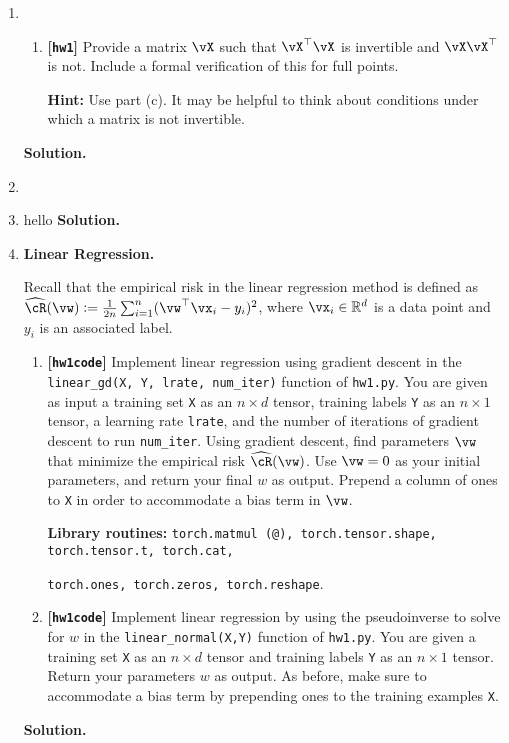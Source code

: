 \documentclass{article}
\def\R{\mathbb{R}}
\def\hcR{\widehat{\cR}}
\def\hw{\textbf{[\texttt{hw1}]}\xspace}
\def\hwcode{\textbf{[\texttt{hw1code}]}\xspace}
\theoremstyle{definition}
\theoremstyle{remark}
\newenvironment{Q}
{%
  \clearpage
  \item
  }
  {%
    \phantom{s} %
    \bigskip
    \textbf{Solution.}
  }
\begin{document}
\begin{enumerate}[font={\Large\bfseries},left=0pt]
\begin{Q}
\begin{enumerate}
    \textbf{Remark:} This characterizes when linear regression has a unique solution due to the normal equation (note that we always have at least one solution obtained by the pseudoinverse). We would not have had a unique solution for part (a) if we had an $n_i = 0$.
    
    \item \hw Provide a matrix $\vX$ such that $\vX^\top \vX$ is invertible and $\vX\vX^\top$ is not. Include a formal verification of this for full points.
    
    \textbf{Hint:} Use part (c). It may be helpful to think about conditions under which a matrix is not invertible.
    
    
  \end{enumerate}
  \end{Q}
	\begin{Q}
			\item hello
		\end{Q}

    \begin{Q}
      \textbf{\Large Linear Regression.}

      Recall that the empirical risk in the linear regression method is defined as $\hcR(\vw) := \frac{1}{2n}\sum_{i=1}^n (\vw^\top \vx_i - y_i)^2$, where $\vx_i \in \R^d$ is a data point and $y_i$ is an associated label.
      \begin{enumerate}
        \item \hwcode Implement linear regression using gradient descent in the \texttt{linear\_gd(X, Y, lrate, num\_iter)} function of \texttt{hw1.py}. You are given as input a training set \texttt{X} as an $n \times d$ tensor, training labels \texttt{Y} as an $n \times 1$ tensor, a learning rate \texttt{lrate}, and the number of iterations of gradient descent to run \texttt{num\_iter}.  Using gradient descent, find parameters $\vw$ that minimize the empirical risk $\hcR(\vw)$. Use $\vw = 0$ as your initial parameters, and return your final $w$ as output. Prepend a column of ones to \texttt{X} in order to accommodate a bias term in $\vw$.

          \textbf{Library routines:} \texttt{torch.matmul (@), torch.tensor.shape, torch.tensor.t, torch.cat,} 

          \texttt{torch.ones, torch.zeros, torch.reshape}.

        \item \hwcode Implement linear regression by using the pseudoinverse to solve for $w$ in the \texttt{linear\_normal(X,Y)} function of \texttt{hw1.py}. You are given a training set \texttt{X} as an $n \times d$ tensor and training labels \texttt{Y} as an $n \times 1$ tensor. Return your parameters $w$ as output. As before, make sure to accommodate a bias term by prepending ones to the training examples \texttt{X}.


\end{enumerate}
\end{Q}
\end{enumerate}
\end{document}
